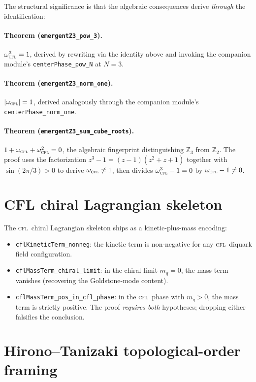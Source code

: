 \documentclass[twocolumn]{revtex4-2}
\newcommand{\CFL}{\textsc{cfl}}
\newcommand{\Zthree}{\mathbb{Z}_3}
\begin{document}
The structural significance is that the algebraic consequences derive
\emph{through} the identification:

\paragraph*{Theorem (\texttt{emergentZ3\_pow\_3}).}
$\omega_\CFL^3 = 1$, derived by rewriting via the identity above and
invoking the companion module's \texttt{centerPhase\_pow\_N} at
$N = 3$.

\paragraph*{Theorem (\texttt{emergentZ3\_norm\_one}).}
$|\omega_\CFL| = 1$, derived analogously through the companion module's
\texttt{centerPhase\_norm\_one}.

\paragraph*{Theorem (\texttt{emergentZ3\_sum\_cube\_roots}).}
$1 + \omega_\CFL + \omega_\CFL^2 = 0$, the algebraic fingerprint
distinguishing $\Zthree$ from $\mathbb{Z}_2$. The proof uses the
factorization $z^3 - 1 = (z - 1)(z^2 + z + 1)$ together with
$\sin(2\pi/3) > 0$ to derive $\omega_\CFL \ne 1$, then divides
$\omega_\CFL^3 - 1 = 0$ by $\omega_\CFL - 1 \ne 0$.

\section{CFL chiral Lagrangian skeleton}
\label{sec:lagrangian}

The \CFL\ chiral Lagrangian skeleton ships as a kinetic-plus-mass
encoding:

\begin{itemize}
\item \texttt{cflKineticTerm\_nonneg}: the kinetic term is
non-negative for any \CFL\ diquark field configuration.
\item \texttt{cflMassTerm\_chiral\_limit}: in the chiral limit
$m_q = 0$, the mass term vanishes (recovering the Goldstone-mode
content).
\item \texttt{cflMassTerm\_pos\_in\_cfl\_phase}: in the \CFL\ phase
with $m_q > 0$, the mass term is strictly positive. The proof
\emph{requires both} hypotheses; dropping either falsifies the
conclusion.
\end{itemize}

\section{Hirono--Tanizaki topological-order framing}
\label{sec:topological-order}
\end{document}
